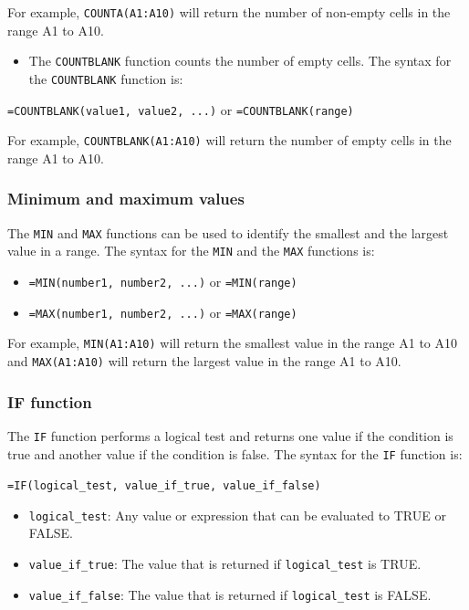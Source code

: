 \documentclass[
]{book}
\providecommand{\tightlist}{%
  \setlength{\itemsep}{0pt}\setlength{\parskip}{0pt}}
\begin{document}
For example, \texttt{COUNTA(A1:A10)} will return the number of non-empty cells in the range A1 to A10.

\begin{itemize}
\tightlist
\item
  The \texttt{COUNTBLANK} function counts the number of empty cells. The syntax for the \texttt{COUNTBLANK} function is:
\end{itemize}

\texttt{=COUNTBLANK(value1,\ value2,\ ...)} or \texttt{=COUNTBLANK(range)}

For example, \texttt{COUNTBLANK(A1:A10)} will return the number of empty cells in the range A1 to A10.

\subsubsection*{Minimum and maximum values}\label{minimum-and-maximum-values}

The \texttt{MIN} and \texttt{MAX} functions can be used to identify the smallest and the largest value in a range. The syntax for the \texttt{MIN} and the \texttt{MAX} functions is:

\begin{itemize}
\item
  \texttt{=MIN(number1,\ number2,\ ...)} or \texttt{=MIN(range)}
\item
  \texttt{=MAX(number1,\ number2,\ ...)} or \texttt{=MAX(range)}
\end{itemize}

For example, \texttt{MIN(A1:A10)} will return the smallest value in the range A1 to A10 and \texttt{MAX(A1:A10)} will return the largest value in the range A1 to A10.

\subsubsection*{IF function}\label{if-function}

The \texttt{IF} function performs a logical test and returns one value if the condition is true and another value if the condition is false. The syntax for the \texttt{IF} function is:

\texttt{=IF(logical\_test,\ value\_if\_true,\ value\_if\_false)}

\begin{itemize}
\item
  \texttt{logical\_test}: Any value or expression that can be evaluated to TRUE or FALSE.
\item
  \texttt{value\_if\_true}: The value that is returned if \texttt{logical\_test} is TRUE.
\item
  \texttt{value\_if\_false}: The value that is returned if \texttt{logical\_test} is FALSE.
\end{itemize}
\end{document}

